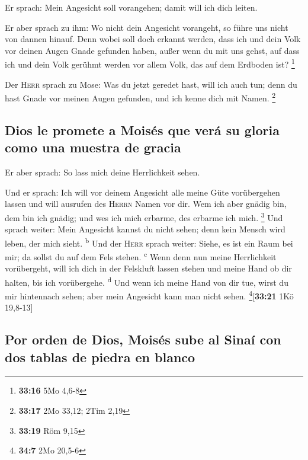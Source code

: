  Er sprach: Mein Angesicht soll vorangehen; damit will
ich dich leiten.

 Er aber sprach zu ihm: Wo nicht dein Angesicht
vorangeht, so führe uns nicht von dannen hinauf.  Denn
wobei soll doch erkannt werden, dass ich und dein Volk vor deinen Augen
Gnade gefunden haben, außer wenn du mit uns gehst, auf dass ich und dein
Volk gerühmt werden vor allem Volk, das auf dem Erdboden ist?
\footnote{\textbf{33:16} 5Mo 4,6-8}

 Der \textsc{Herr} sprach zu Mose: Was du jetzt geredet
hast, will ich auch tun; denn du hast Gnade vor meinen Augen gefunden,
und ich kenne dich mit Namen. \footnote{\textbf{33:17} 2Mo 33,12; 2Tim
  2,19}

\hypertarget{dios-le-promete-a-moisuxe9s-que-veruxe1-su-gloria-como-una-muestra-de-gracia}{%
\subsection{Dios le promete a Moisés que verá su gloria como una muestra
de
gracia}\label{dios-le-promete-a-moisuxe9s-que-veruxe1-su-gloria-como-una-muestra-de-gracia}}

 Er aber sprach: So lass mich deine Herrlichkeit sehen.

 Und er sprach: Ich will vor deinem Angesicht alle meine
Güte vorübergehen lassen und will ausrufen des \textsc{Herrn} Namen vor
dir. Wem ich aber gnädig bin, dem bin ich gnädig; und wes ich mich
erbarme, des erbarme ich mich. \footnote{\textbf{33:19} Röm 9,15}
 Und sprach weiter: Mein Angesicht kannst du nicht sehen;
denn kein Mensch wird leben, der mich sieht. \textsuperscript{b}
 Und der \textsc{Herr} sprach weiter: Siehe, es ist ein
Raum bei mir; da sollst du auf dem Fels stehen. \textsuperscript{c}
 Wenn denn nun meine Herrlichkeit vorübergeht, will ich
dich in der Felskluft lassen stehen und meine Hand ob dir halten, bis
ich vorübergehe. \textsuperscript{d}  Und wenn ich meine
Hand von dir tue, wirst du mir hintennach sehen; aber mein Angesicht
kann man nicht sehen. \footnote{\textbf{34:7} 2Mo 20,5-6}{[}\textbf{33:21}
1Kö 19,8-13{]}

\hypertarget{por-orden-de-dios-moisuxe9s-sube-al-sinauxed-con-dos-tablas-de-piedra-en-blanco}{%
\subsection{Por orden de Dios, Moisés sube al Sinaí con dos tablas de
piedra en
blanco}\label{por-orden-de-dios-moisuxe9s-sube-al-sinauxed-con-dos-tablas-de-piedra-en-blanco}}

